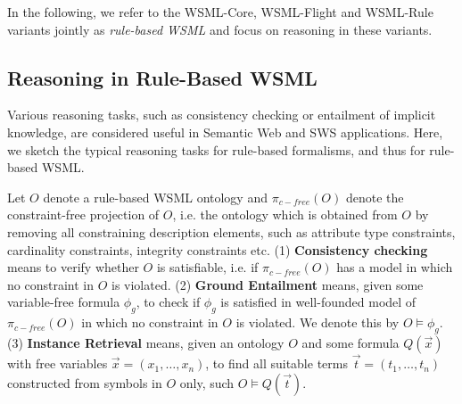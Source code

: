 In the following, we refer to the WSML-Core, WSML-Flight and
WSML-Rule variants jointly as \emph{rule-based WSML} and focus on
reasoning in these variants.

\subsection{Reasoning in Rule-Based WSML}
Various reasoning tasks, such as consistency checking or
entailment of implicit knowledge, are considered useful in
Semantic Web and SWS applications. Here, we sketch the typical
reasoning tasks for rule-based formalisms, and thus for rule-based
WSML.

Let $O$ denote a rule-based WSML ontology and $\pi_{c-free}(O)$ denote the
constraint-free projection of $O$, i.e. the ontology which is
obtained from $O$ by removing all constraining description
elements, such as attribute type constraints, cardinality
constraints, integrity constraints etc. (1) {\bf Consistency
checking} means to verify whether $O$ is satisfiable, i.e.
if $\pi_{c-free}(O)$ has a
model in which no constraint in $O$ is violated. (2) {\bf Ground Entailment} means, given some variable-free
formula $\phi_g$, to check if $\phi_g$ is satisfied in well-founded model of $\pi_{c-free}(O)$
in which no constraint in $O$ is violated. We
denote this by $O \models \phi_g$. (3) {\bf Instance Retrieval}
means, given an ontology $O$ and some formula $Q(\vec{x})$ with
free variables $\vec{x} = (x_1,\ldots,x_n)$, to find all suitable
terms $\vec{t} = (t_1,\ldots,t_n)$ constructed from symbols in $O$
only, such $O \models Q(\vec{t})$.
